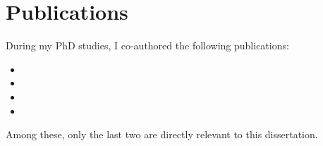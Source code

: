 \chapter*{Publications}

During my PhD studies, I co-authored the following publications:
\begin{itemize}
\item[\cite{Czakon:2022dwk}] 
\item[\cite{Czakon:2023tld}] 
\item[\cite{Czakon:2023kqm}] 
\item[\cite{Czakon:2024ywb}] 
\end{itemize}
\vspace{15pt}
Among these, only the last two are directly relevant to this dissertation.



